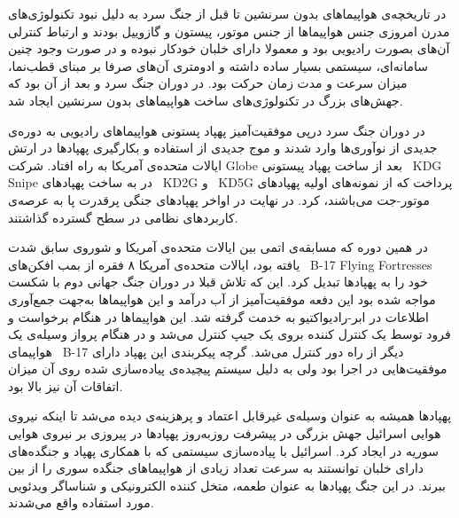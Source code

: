 
در تاریخچه‌ی هواپیماهای بدون سرنشین تا قبل از جنگ سرد به دلیل نبود تکنولوژی‌های مدرن امروزی جنس هواپیماها از جنس موتور، پیستون و گازوییل بودند و ارتباط کنترلی آن‌های بصورت رادیویی بود و معمولا دارای خلبان خودکار نبوده و در صورت وجود چنین سامانه‌ای، سیستمی بسیار ساده داشته و ادومتری آن‌های صرفا بر مبنای قطب‌نما، میزان سرعت و مدت زمان حرکت بود. در دوران جنگ سرد و بعد از آن بود که جهش‌های بزرگ در تکنولوژی‌های ساخت هواپیماهای بدون سرنشین ایجاد شد.

در دوران جنگ سرد درپی موفقیت‌آمیز پهپاد پستونی هواپیماهای رادیویی به دوره‌ی جدیدی از نوآوری‌ها وارد شدند و موج جدیدی از استفاده و بکارگیری پهپادها در ارتش ایالات متحده‌ی آمریکا به راه افتاد. شرکت Globe بعد از ساخت پهپاد پیستونی \ {KDG Snipe} در  به ساخت پهپادهای \ {KD2G} و \ {KD5G} پرداخت که از نمونه‌های اولیه پهپادهای موتور-جت می‌باشند، کرد. در نهایت در اواخر  پهپادهای جنگی پرقدرت پا به عرصه‌ی کاربردهای نظامی در سطح گسترده گذاشتند.


در همین دوره که مسابقه‌ی اتمی بین ایالات متحده‌ی آمریکا و شوروی سابق شدت یافته بود، ایالات متحده‌ی آمریکا ۸ فقره از بمب افکن‌های \ {B-17 Flying Fortresses} خود را به پهپادها تبدیل کرد. این که تلاش قبلا در دوران جنگ جهانی دوم با شکست مواجه شده بود این دفعه موفقیت‌آمیز از آب درآمد و این هواپیماها به‌جهت جمع‌آوری اطلاعات در ابر-رادیواکتیو به خدمت گرفته شد. این هواپیماها در هنگام برخواست و فرود توسط یک کنترل کننده بروی یک جیپ کنترل می‌شد و در هنگام پرواز وسیله‌‌ی یک هواپیمای \ {B-17} دیگر از راه دور کنترل می‌شد. گرچه پیکربندی این پهپاد دارای موفقیت‌هایی در اجرا بود ولی به دلیل سیستم پیچیده‌ی پیاده‌سازی شده روی آن میزان اتفاقات آن نیز بالا بود.

پهپادها همیشه به عنوان وسیله‌ی غیرقابل اعتماد و پرهزینه‌ی دیده می‌شد تا اینکه نیروی هوایی اسرائیل جهش بزرگی در پیشرفت روزبه‌روز پهپاد‌ها در پیروزی بر نیروی هوایی سوریه در  ایجاد کرد. اسرائیل با پیاده‌سازی سیستمی که با همکاری پهپاد و جنگده‌های دارای خلبان توانستند به سرعت تعداد زیادی از هواپیماهای جنگده سوری را از بین ببرند. در این جنگ پهپادها به عنوان طعمه‌، متخل کننده‌ الکترونیکی و شناساگر ویدئویی مورد استفاده واقع می‌شدند.
